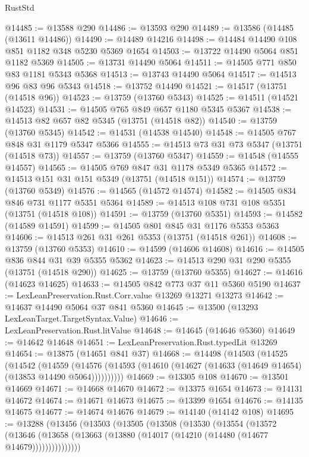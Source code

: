 \begin{lexlean}{RustStd}
\begin{coremodule}
@14485 := @13588 @290
@14486 := @13593 @290
@14489 := @13586 (@14485 (@13611 @14486))
@14490 := @14489 @14216
@14498 := @14484 @14490 @108 @851 @1182 @348 @5230 @5369 @1654
@14503 := @13722 @14490 @5064 @851 @1182 @5369
@14505 := @13731 @14490 @5064
@14511 := @14505 @771 @850 @83 @1181 @5343 @5368
@14513 := @13743 @14490 @5064
@14517 := @14513 @96 @83 @96 @5343
@14518 := @13752 @14490
@14521 := @14517 (@13751 (@14518 @96))
@14523 := @13759 (@13760 @5343)
@14525 := @14511 (@14521 @14523)
@14531 := @14505 @765 @849 @657 @1180 @5345 @5367
@14538 := @14513 @82 @657 @82 @5345 (@13751 (@14518 @82))
@14540 := @13759 (@13760 @5345)
@14542 := @14531 (@14538 @14540)
@14548 := @14505 @767 @848 @31 @1179 @5347 @5366
@14555 := @14513 @73 @31 @73 @5347 (@13751 (@14518 @73))
@14557 := @13759 (@13760 @5347)
@14559 := @14548 (@14555 @14557)
@14565 := @14505 @769 @847 @31 @1178 @5349 @5365
@14572 := @14513 @151 @31 @151 @5349 (@13751 (@14518 @151))
@14574 := @13759 (@13760 @5349)
@14576 := @14565 (@14572 @14574)
@14582 := @14505 @834 @846 @731 @1177 @5351 @5364
@14589 := @14513 @108 @731 @108 @5351 (@13751 (@14518 @108))
@14591 := @13759 (@13760 @5351)
@14593 := @14582 (@14589 @14591)
@14599 := @14505 @801 @845 @31 @1176 @5353 @5363
@14606 := @14513 @261 @31 @261 @5353 (@13751 (@14518 @261))
@14608 := @13759 (@13760 @5353)
@14610 := @14599 (@14606 @14608)
@14616 := @14505 @836 @844 @31 @39 @5355 @5362
@14623 := @14513 @290 @31 @290 @5355 (@13751 (@14518 @290))
@14625 := @13759 (@13760 @5355)
@14627 := @14616 (@14623 @14625)
@14633 := @14505 @842 @773 @37 @11 @5360 @5190
@14637 := LexLeanPreservation.Rust.Corr.value @13269 @13271 @13273
@14642 := @14637 @14490 @5064 @37 @841 @5360
@14645 := @13500 (@13293 LexLeanTarget.TargetSyntax.Value)
@14646 := LexLeanPreservation.Rust.litValue
@14648 := @14645 (@14646 @5360)
@14649 := @14642 @14648
@14651 := LexLeanPreservation.Rust.typedLit @13269
@14654 := @13875 (@14651 @841 @37)
@14668 := @14498
    (@14503
      (@14525
        (@14542
          (@14559
            (@14576 (@14593 (@14610 (@14627 (@14633 (@14649 @14654) (@13853 @14490 @5064))))))))))
@14669 := @13305 @108
@14670 := @13501 @14669
@14671 := @14668 @14670
@14672 := @13375 @1654
@14673 := @14131 @14672
@14674 := @14671 @14673
@14675 := @13399 @1654
@14676 := @14135 @14675
@14677 := @14674 @14676
@14679 := @14140 (@14142 @108)
@14695 := @13288
    (@13456
      (@13503
        (@13505
          (@13508
            (@13530
              (@13554
                (@13572
                  (@13646
                    (@13658 (@13663 (@13880 (@14017 (@14210 (@14480 (@14677 @14679)))))))))))))))

\end{coremodule}
\end{lexlean}
